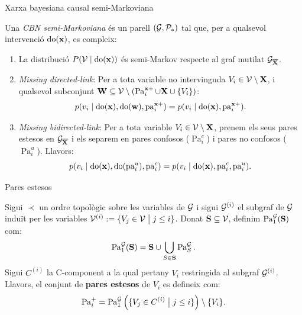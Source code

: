 \documentclass{bestbeamer}
\begin{document}
\begin{frame}{Xarxa bayesiana causal semi-Markoviana}
\begin{definition}\label{def:semi_markov_cbn}
Una \textit{CBN semi-Markoviana} és un parell $(\mathcal{G},\mathcal{P}_*)$ tal que, per a qualsevol intervenció $\operatorname{do}(\mathbf{x})$, es compleix:
\begin{enumerate}
    \item La distribució $P(\mathcal{V} \mid \operatorname{do}(\mathbf{x}))$ és semi-Markov respecte al graf mutilat $\mathcal{G}_{\overline{\mathbf{X}}}$.
    \item \textit{Missing directed-link}: Per a tota variable no intervinguda $V_i \in \mathcal{V} \setminus \mathbf{X}$, i qualsevol subconjunt $\mathbf{W} \subseteq \mathcal{V} \setminus (\operatorname{Pa}_i^{\mathbf{x} +} \cup \mathbf{X} \cup \{V_i\})$:
    \begin{equation*}
        p(v_i \mid \operatorname{do}(\mathbf{x}),\operatorname{do}(\mathbf{w}),\operatorname{pa}_i^{\mathbf{x} +}) = p(v_i \mid \operatorname{do}(\mathbf{x}),\operatorname{pa}_i^{\mathbf{x} +}).
    \end{equation*}
    \item \textit{Missing bidirected-link}: Per a tota variable $V_i \in \mathcal{V} \setminus \mathbf{X}$, prenem els seus pares estesos en $\mathcal{G}_{\overline{\mathbf{X}}}$ i els separem en pares confosos ($\operatorname{Pa}_i^c$) i pares no confosos ($\operatorname{Pa}_i^u$). Llavors:
    \begin{equation*}
        p(v_i \mid \operatorname{do}(\mathbf{x}),\operatorname{do}(\operatorname{pa}_i^u),\operatorname{pa}_i^c) = p(v_i \mid \operatorname{do}(\mathbf{x}),\operatorname{pa}_i^c, \operatorname{pa}_i^u).
    \end{equation*}
\end{enumerate}
\end{definition}
\end{frame}
\begin{frame}{Pares estesos}
\begin{definition}\label{def:paresestesos}
Sigui $\prec$ un ordre topològic sobre les variables de $\mathcal{G}$ i sigui $\mathcal{G}^{(i)}$ el subgraf de $\mathcal{G}$ induït per les variables $\mathcal{V}^{(i)}:=\{V_j\in\mathcal{V}\; \big| \; j\leq i\}$. Donat $\mathbf{S} \subseteq \mathcal{V}$, definim $\operatorname{Pa}_1^{\mathcal{G}}(\mathbf{S})$ com:
\begin{equation*}
\operatorname{Pa}_1^{\mathcal{G}}(\mathbf{S}) = \mathbf{S} \cup \bigcup_{S \in \mathbf{S}} \operatorname{Pa}_S^{\mathcal{G}}.
\end{equation*}
Sigui $C^{(i)}$ la C-component a la qual pertany $V_i$ restringida al subgraf $\mathcal{G}^{(i)}$. Llavors, el conjunt de \textbf{pares estesos} de $V_i$ es defineix com:
\begin{equation*}
    \operatorname{Pa}_i^+ = \operatorname{Pa}_1^{\mathcal{G}}\left(\{V_j\in C^{(i)} \; \big| \; j\leq i\}\right) \setminus \{V_i\}.
\end{equation*}
\end{definition}
\end{frame}
\end{document}
